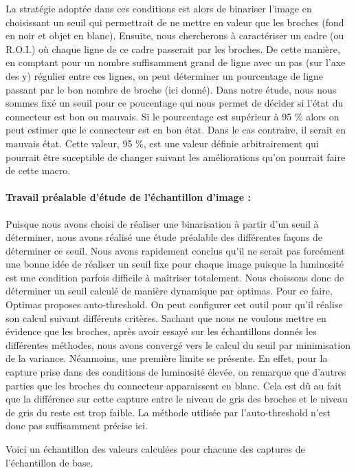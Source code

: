 \documentclass{scrreprt}
\begin{document}
La stratégie adoptée dans ces conditions est alors de binariser l'image en choisissant un seuil qui permettrait
de ne mettre en valeur que les broches (fond en noir et objet en blanc). Ensuite, nous chercherons à caractériser un
cadre (ou R.O.I.) où chaque ligne de ce cadre passerait par les broches. De cette manière, en comptant pour un nombre
suffisamment grand de ligne avec un pas (sur l'axe des y) régulier entre ces lignes, on peut déterminer un pourcentage
de ligne passant par le bon nombre de broche (ici donné). Dans notre étude, nous nous sommes fixé un seuil pour ce poucentage
qui nous permet de décider si l'état du connecteur est bon ou mauvais. Si le pourcentage est supérieur à 95 \% alors on peut 
estimer que le connecteur est en bon état. Dans le cas contraire, il serait en mauvais état. Cette valeur, 95 \%, est une valeur
définie arbitrairement qui pourrait être suceptible de changer suivant les améliorations qu'on pourrait faire de cette macro.

\paragraph{Travail préalable d'étude de l'échantillon d'image : }
Puisque nous avons choisi de réaliser une binarisation à partir d'un seuil à déterminer, nous avons réalisé 
une étude préalable des différentes façons de déterminer ce seuil. Nous avons rapidement conclus qu'il ne serait
pas forcément une bonne idée de réaliser un seuil fixe pour chaque image puisque la luminosité est une condition 
parfois difficile à maîtriser totalement. Nous choissons donc de déterminer un seuil calculé de manière dynamique
par optimas. Pour ce faire, Optimas proposes auto-threshold. On peut configurer cet outil pour qu'il réalise son 
calcul suivant différents critères. Sachant que nous ne voulons mettre en évidence que les broches, après avoir
essayé sur les échantillons donnés les différentes méthodes, nous avons convergé vers le calcul du seuil par 
minimisation de la variance. Néanmoins, une première limite se présente. En effet, pour la capture prise 
dans des conditions de luminosité élevée, on remarque que d'autres parties que les broches du connecteur apparaissent
en blanc. Cela est dû au fait que la différence sur cette capture entre le niveau de gris des broches et le niveau de
gris du reste est trop faible. La méthode utilisée par l'auto-threshold n'est donc pas suffisamment précise ici. 

Voici un échantillon des valeurs calculées pour chacune des captures de l'échantillon de base. 
\end{document}
